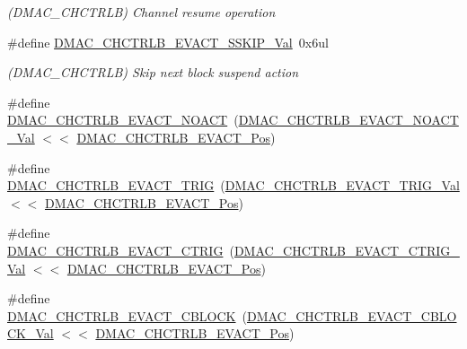 \begin{DoxyCompactItemize}
\begin{DoxyCompactList}\small\item\em (D\+M\+A\+C\+\_\+\+C\+H\+C\+T\+R\+LB) Channel resume operation \end{DoxyCompactList}\item 
\#define \mbox{\hyperlink{group___s_a_m_d21___d_m_a_c_ga30fe7c169fb72d0ba2f073769858069a}{D\+M\+A\+C\+\_\+\+C\+H\+C\+T\+R\+L\+B\+\_\+\+E\+V\+A\+C\+T\+\_\+\+S\+S\+K\+I\+P\+\_\+\+Val}}~0x6ul
\begin{DoxyCompactList}\small\item\em (D\+M\+A\+C\+\_\+\+C\+H\+C\+T\+R\+LB) Skip next block suspend action \end{DoxyCompactList}\item 
\#define \mbox{\hyperlink{group___s_a_m_d21___d_m_a_c_ga71d77ee941fa3622ab00c73f71846f65}{D\+M\+A\+C\+\_\+\+C\+H\+C\+T\+R\+L\+B\+\_\+\+E\+V\+A\+C\+T\+\_\+\+N\+O\+A\+CT}}~(\mbox{\hyperlink{group___s_a_m_d21___d_m_a_c_ga0a82857cf374c8eb7754e671c886dcac}{D\+M\+A\+C\+\_\+\+C\+H\+C\+T\+R\+L\+B\+\_\+\+E\+V\+A\+C\+T\+\_\+\+N\+O\+A\+C\+T\+\_\+\+Val}}  $<$$<$ \mbox{\hyperlink{group___s_a_m_d21___d_m_a_c_ga5d582eee4f8e2bfd97709b103da6830e}{D\+M\+A\+C\+\_\+\+C\+H\+C\+T\+R\+L\+B\+\_\+\+E\+V\+A\+C\+T\+\_\+\+Pos}})
\item 
\#define \mbox{\hyperlink{group___s_a_m_d21___d_m_a_c_gad57584fbe4da10d355cdea4acc6cfec6}{D\+M\+A\+C\+\_\+\+C\+H\+C\+T\+R\+L\+B\+\_\+\+E\+V\+A\+C\+T\+\_\+\+T\+R\+IG}}~(\mbox{\hyperlink{group___s_a_m_d21___d_m_a_c_ga069ed2b2546fdd8706fe1eedcb1674d2}{D\+M\+A\+C\+\_\+\+C\+H\+C\+T\+R\+L\+B\+\_\+\+E\+V\+A\+C\+T\+\_\+\+T\+R\+I\+G\+\_\+\+Val}}   $<$$<$ \mbox{\hyperlink{group___s_a_m_d21___d_m_a_c_ga5d582eee4f8e2bfd97709b103da6830e}{D\+M\+A\+C\+\_\+\+C\+H\+C\+T\+R\+L\+B\+\_\+\+E\+V\+A\+C\+T\+\_\+\+Pos}})
\item 
\#define \mbox{\hyperlink{group___s_a_m_d21___d_m_a_c_ga13f2fdfac3a5fd93284fcf317ae90e6b}{D\+M\+A\+C\+\_\+\+C\+H\+C\+T\+R\+L\+B\+\_\+\+E\+V\+A\+C\+T\+\_\+\+C\+T\+R\+IG}}~(\mbox{\hyperlink{group___s_a_m_d21___d_m_a_c_ga4cf090f0ab1ac7d1231fb79627925227}{D\+M\+A\+C\+\_\+\+C\+H\+C\+T\+R\+L\+B\+\_\+\+E\+V\+A\+C\+T\+\_\+\+C\+T\+R\+I\+G\+\_\+\+Val}}  $<$$<$ \mbox{\hyperlink{group___s_a_m_d21___d_m_a_c_ga5d582eee4f8e2bfd97709b103da6830e}{D\+M\+A\+C\+\_\+\+C\+H\+C\+T\+R\+L\+B\+\_\+\+E\+V\+A\+C\+T\+\_\+\+Pos}})
\item 
\#define \mbox{\hyperlink{group___s_a_m_d21___d_m_a_c_ga0e602e4e69b117845a5bfa2d76f60b6b}{D\+M\+A\+C\+\_\+\+C\+H\+C\+T\+R\+L\+B\+\_\+\+E\+V\+A\+C\+T\+\_\+\+C\+B\+L\+O\+CK}}~(\mbox{\hyperlink{group___s_a_m_d21___d_m_a_c_ga87b04d4f4a880d5fab6638ae0281a535}{D\+M\+A\+C\+\_\+\+C\+H\+C\+T\+R\+L\+B\+\_\+\+E\+V\+A\+C\+T\+\_\+\+C\+B\+L\+O\+C\+K\+\_\+\+Val}} $<$$<$ \mbox{\hyperlink{group___s_a_m_d21___d_m_a_c_ga5d582eee4f8e2bfd97709b103da6830e}{D\+M\+A\+C\+\_\+\+C\+H\+C\+T\+R\+L\+B\+\_\+\+E\+V\+A\+C\+T\+\_\+\+Pos}})

\end{DoxyCompactItemize}
